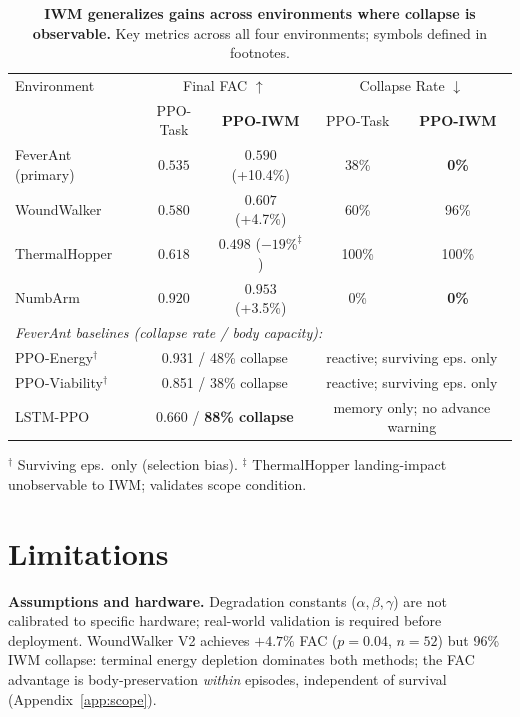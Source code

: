 \documentclass{article}
\begin{document}
{\begin{table}[h]
\centering
\caption{\textbf{IWM generalizes gains across environments where collapse is observable.} Key metrics across all four environments; symbols defined in footnotes.}
\label{tab:summary}
\small
\begin{tabular}{lcccc}
\toprule
Environment & \multicolumn{2}{c}{Final FAC $\uparrow$} & \multicolumn{2}{c}{Collapse Rate $\downarrow$} \\
 & PPO-Task & \cellcolor{maroonhl}\textcolor{maroonprimary}{\textbf{PPO-IWM}} & PPO-Task & \cellcolor{maroonhl}\textcolor{maroonprimary}{\textbf{PPO-IWM}} \\
\midrule
\rowcolor{maroonhl}FeverAnt (primary)   & $0.535$ & $\mathbf{0.590}$ (+10.4\%) & 38\% & \textbf{0\%} \\
WoundWalker          & $0.580$ & $\mathbf{0.607}$ (+4.7\%)  & 60\% & 96\% \\
ThermalHopper        & $\mathbf{0.618}$ & $0.498$ ($-19\%^\ddagger$) & 100\% & 100\% \\
\rowcolor{maroonhl}NumbArm              & $0.920$ & $\mathbf{0.953}$ (+3.5\%)  & 0\%  & \textbf{0\%} \\
\midrule
\multicolumn{5}{l}{\textit{FeverAnt baselines (collapse rate / body capacity):}} \\
PPO-Energy$^\dagger$ & \multicolumn{2}{c}{0.931 / 48\% collapse} & \multicolumn{2}{c}{reactive; surviving eps. only} \\
PPO-Viability$^\dagger$ & \multicolumn{2}{c}{0.851 / 38\% collapse} & \multicolumn{2}{c}{reactive; surviving eps. only} \\
LSTM-PPO & \multicolumn{2}{c}{0.660 / \textbf{88\% collapse}} & \multicolumn{2}{c}{memory only; no advance warning} \\
\bottomrule
\end{tabular}
\end{table}
\noindent\small{$^\dagger$ Surviving eps.\ only (selection bias). \quad $^\ddagger$ ThermalHopper landing-impact unobservable to IWM; validates scope condition.}

\section{Limitations}
\label{sec:limitations}

\textbf{Assumptions and hardware.} Degradation constants ($\alpha,\beta,\gamma$) are not calibrated to specific hardware; real-world validation is required before deployment. WoundWalker V2 achieves $+4.7\%$ FAC ($p\!=\!0.04$, $n\!=\!52$) but 96\% IWM collapse: terminal energy depletion dominates both methods; the FAC advantage is body-preservation \emph{within} episodes, independent of survival (Appendix~\ref{app:scope}).

}
\end{document}
